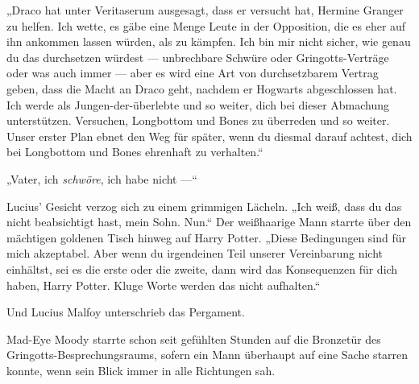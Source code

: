 „Draco hat unter Veritaserum ausgesagt, dass er versucht hat, Hermine Granger zu helfen. Ich wette, es gäbe eine Menge Leute in der Opposition, die es eher auf ihn ankommen lassen würden, als zu kämpfen. Ich bin mir nicht sicher, wie genau du das durchsetzen würdest — unbrechbare Schwüre oder Gringotts-Verträge oder was auch immer — aber es wird eine Art von durchsetzbarem Vertrag geben, dass die Macht an Draco geht, nachdem er Hogwarts abgeschlossen hat. Ich werde als Jungen-der-überlebte und so weiter, dich bei dieser Abmachung unterstützen. Versuchen, Longbottom und Bones zu überreden und so weiter. Unser erster Plan ebnet den Weg für später, wenn du diesmal darauf achtest, dich bei Longbottom und Bones ehrenhaft zu verhalten.“

„Vater, ich \emph{schwöre}, ich habe nicht —“

Lucius’ Gesicht verzog sich zu einem grimmigen Lächeln.
„Ich weiß, dass du das nicht beabsichtigt hast, mein Sohn. Nun.“
Der weißhaarige Mann starrte über den mächtigen goldenen Tisch hinweg auf Harry Potter.
„Diese Bedingungen sind für mich akzeptabel. Aber wenn du irgendeinen Teil unserer Vereinbarung nicht einhältst, sei es die erste oder die zweite, dann wird das Konsequenzen für dich haben, Harry Potter. Kluge Worte werden das nicht aufhalten.“

Und Lucius Malfoy unterschrieb das Pergament.

\later

Mad-Eye Moody starrte schon seit gefühlten Stunden auf die Bronzetür des Gringotts-Besprechungsraums, sofern ein Mann überhaupt auf eine Sache starren konnte, wenn sein Blick immer in alle Richtungen sah.

